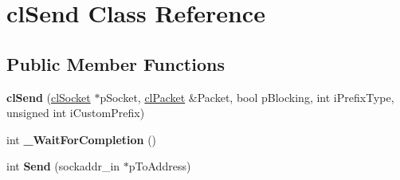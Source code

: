 \hypertarget{classcl_send}{
\section{clSend Class Reference}
\label{classcl_send}
}
\subsection*{Public Member Functions}
\begin{DoxyCompactItemize}
\item 
\hypertarget{classcl_send_a6789e1a7527d758cfbbad37b0e1e4143}{
{\bfseries clSend} (\hyperlink{classcl_socket}{clSocket} $\ast$pSocket, \hyperlink{classcl_packet}{clPacket} \&Packet, bool pBlocking, int iPrefixType, unsigned int iCustomPrefix)}
\label{classcl_send_a6789e1a7527d758cfbbad37b0e1e4143}

\item 
\hypertarget{classcl_send_a1157e0e4772d4994d35cf068c4bf77f5}{
int {\bfseries \_\-WaitForCompletion} ()}
\label{classcl_send_a1157e0e4772d4994d35cf068c4bf77f5}

\item 
\hypertarget{classcl_send_af7905d07e9556ce4709704856de5b090}{
int {\bfseries Send} (sockaddr\_\-in $\ast$pToAddress)}
\label{classcl_send_af7905d07e9556ce4709704856de5b090}

\end{DoxyCompactItemize}
